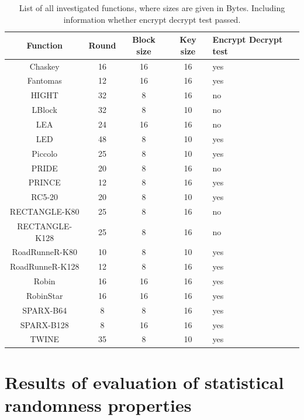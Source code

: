 \documentclass[
    digital,    %
    oneside,    %
    color,
    11pt,
    nocover,
    notable,
    nolof,
    nolot,
    final
]{fithesis3}
\begin{document}
\begin{table}[t]
	\centering
	\begin{tabular}{c|c c c l}
		\textbf{\large Function} & \textbf{\large Round} & \textbf{\large Block size} & \textbf{\large Key size} & \textbf{\large Encrypt Decrypt test}\\ \hline
		Chaskey			& 16	& 16	& 16	& yes 	\\ \hline
		Fantomas		& 12	& 16	& 16	& yes 	\\ \hline
		HIGHT			& 32	& 8		& 16	& no 	\\ \hline
		LBlock			& 32	& 8		& 10	& no \\ \hline
		LEA				& 24	& 16	& 16	& no \\ \hline
		LED 			& 48	& 8		& 10	& yes \\ \hline
		Piccolo			& 25	& 8		& 10	& yes \\ \hline
		PRIDE			& 20	& 8		& 16	& no  \\ \hline
		PRINCE			& 12	& 8		& 16	& yes \\ \hline
		RC5-20			& 20	& 8		& 10	& yes \\ \hline
		RECTANGLE-K80	& 25	& 8		& 16	& no \\ \hline
		RECTANGLE-K128	& 25	& 8		& 16	& no \\ \hline
		RoadRunneR-K80	& 10	& 8		& 10	& yes \\ \hline
		RoadRunneR-K128	& 12	& 8		& 16	& yes \\ \hline
		Robin			& 16	& 16	& 16	& yes \\ \hline
		RobinStar		& 16	& 16	& 16	& yes \\ \hline
		SPARX-B64		& 8		& 8		& 16	& yes \\ \hline
		SPARX-B128		& 8		& 16	& 16	& yes \\ \hline
		TWINE			& 35	& 8		& 10	& yes \\ \hline
		
		
	\end{tabular}
	\caption{List of all investigated functions, where sizes are given in Bytes. Including information whether encrypt decrypt test passed.}
	\label{table:list-of-investigated functions}
\end{table}



\chapter{Results of evaluation of statistical randomness properties}





\printbibliography[heading=bibintoc] %

\appendix{}
\end{document}
